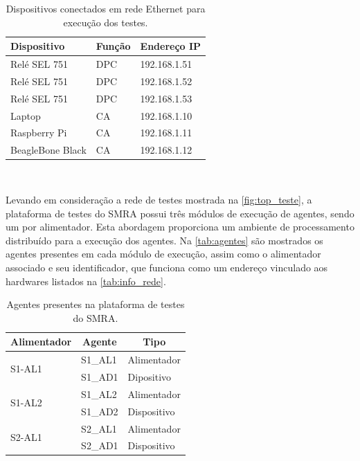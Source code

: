 \documentclass[journal]{IEEEtran}
\begin{document}
\begin{table}[htb]
    \centering
    \caption{\label{tab:info_rede} Dispositivos conectados em rede Ethernet para execução dos testes.}
    \begin{tabular}{p{1.0in}p{0.5in}p{1.0in}}
        \toprule
        Dispositivo & Função & Endereço IP \\[0.1in]
        \midrule
        \midrule
        Relé SEL 751 & DPC & 192.168.1.51 \\
        \midrule
        Relé SEL 751 & DPC & 192.168.1.52 \\
        \midrule
        Relé SEL 751 & DPC & 192.168.1.53 \\
        \midrule
        Laptop & CA & 192.168.1.10 \\
        \midrule
        Raspberry Pi & CA & 192.168.1.11 \\
        \midrule
        BeagleBone Black & CA & 192.168.1.12 \\
        \bottomrule
    \end{tabular}
    \\[0.1in]
\end{table}

Levando em consideração a rede de testes mostrada na \autoref{fig:top_teste}, a plataforma de testes do SMRA possui três módulos de execução de agentes, sendo um por alimentador. Esta abordagem proporciona um ambiente de processamento distribuído para a execução dos agentes. Na \autoref{tab:agentes} são mostrados os agentes presentes em cada módulo de execução, assim como o alimentador associado e seu identificador, que funciona como um endereço vinculado aos hardwares listados na \autoref{tab:info_rede}.

\begin{table}[htb]
    \centering
    \caption{\label{tab:agentes} Agentes presentes na plataforma de testes do SMRA.}
    \begin{tabular}{p{0.8in}p{0.5in}p{1.0in}}
        \toprule
         \multicolumn{1}{c}{Alimentador} & \multicolumn{1}{c}{Agente} & \multicolumn{1}{c}{Tipo} \\[0.1in]
        \midrule
        \midrule
        \multirow{2}{1.0in}{S1-AL1} & S1\_AL1 & Alimentador \\
        & S1\_AD1 & Dipositivo \\
        \midrule
        \multirow{2}{1.0in}{S1-AL2} & S1\_AL2 & Alimentador \\
        & S1\_AD2 & Dispositivo \\
        \midrule
        \multirow{2}{1.0in}{S2-AL1} & S2\_AL1 & Alimentador \\
        & S2\_AD1 & Dispositivo \\
        \bottomrule
    \end{tabular}
\end{table}
\end{document}
